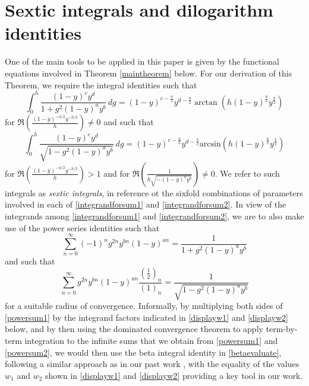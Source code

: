 \documentclass[12pt]{article}
\begin{document}
\section{Sextic integrals and dilogarithm identities}\label{sectionsextic}
 One of the main tools to be applied in this paper is given by the functional equations involved in Theorem \ref{maintheorem} below. 
 For our derivation of this Theorem, we require the integral identities such that 
\begin{equation}\label{integrandforsum1}
 \int_{0}^{h} \frac{(1 - y)^c y^d}{1 + g^2 (1 - y)^a y^b} \, dg = (1 - y)^{c - \frac{a}{2}} y^{d - \frac{b}{2}} 
 \operatorname{arctan}\left( h (1 - y)^{\frac{a}{2}} y^{\frac{b}{2}} \right) 
 \end{equation}
 for $\Re\left( \frac{ \left( 1 - y \right)^{-a/2} y^{-b/2} }{h} \right) \neq 0$ and such that 
\begin{equation}\label{integrandforsum2}
 \int_0^h \frac{(1 - y)^c y^d}{\sqrt{1 - g^2 (1 - y)^a y^b}} \, dg = (1 - y)^{c - \frac{a}{2}} y^{d - 
 \frac{b}{2}} \text{arcsin}\left( h (1 - y)^{\frac{a}{2}} y^{\frac{b}{2}} \right) 
 \end{equation}
 for $\Re\left( \frac{ \left( 1 - y \right)^{-a/2} y^{-b/2} }{h} \right) > 1$ and 
 for $\Re\left( \frac{1}{h \sqrt{ -(1-y)^{a} y^{b} }} \right) \neq 0$. 
 We refer to such integrals as \emph{sextic integrals}, in reference ot the sixfold combinations of parameters involved in each of 
 \eqref{integrandforsum1} and \eqref{integrandforsum2}. In view of the integrands among \eqref{integrandforsum1} and 
 \eqref{integrandforsum2}, we are to also make use of the power series identities such that 
\begin{equation}\label{powersum1}
 \sum_{n=0}^{\infty} (-1)^n g^{2n} y^{bn} (1 - y)^{an} = \frac{1}{1 + g^2 (1 - y)^a y^b}
\end{equation}
 and such that 
\begin{equation}\label{powersum2}
 \sum_{n=0}^{\infty} g^{2n} y^{bn} (1 - y)^{an} \frac{ \left( \frac{1}{2}
 \right)_n}{(1)_n} = \frac{1}{\sqrt{1 - g^2 (1 - y)^a y^b}} 
\end{equation} 
 for a suitable radius of convergence. Informally, by multiplying both sides of \eqref{powersum1} by the integrand factors indicated in 
 \eqref{displayw1} and \eqref{displayw2} below, and by then using the dominated convergence theorem to apply term-by-term 
 integration to the infinite sums that we obtain from \eqref{powersum1} and \eqref{powersum2}, 
 we would then use the beta integral identity in \eqref{betaevaluate}, 
 following a similar approach as in our past work \cite{Hakimoglupreprint}, 
 with the equality of the values $w_{1}$ and $w_{2}$ shown in 
 \eqref{displayw1} and \eqref{displayw2} providing a key tool in our work. 
\end{document}
